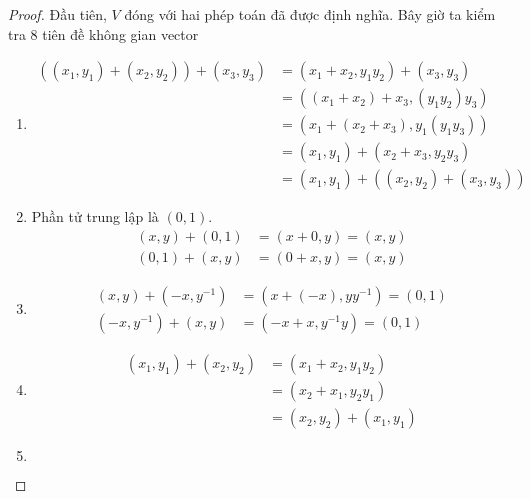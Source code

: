\begin{proof}
    Đầu tiên, $V$ đóng với hai phép toán đã được định nghĩa. Bây giờ ta kiểm tra 8 tiên đề không gian vector
    \begin{enumerate}[label = (V\arabic*)]
        \item
              \begin{align*}
                  ((x_{1}, y_{1}) + (x_{2}, y_{2})) + (x_{3}, y_{3}) & = (x_{1} + x_{2}, y_{1}y_{2}) + (x_{3}, y_{3})       \\
                                                                     & = ((x_{1} + x_{2}) + x_{3}, (y_{1}y_{2})y_{3})       \\
                                                                     & = (x_{1} + (x_{2} + x_{3}), y_{1}(y_{1}y_{3}))       \\
                                                                     & = (x_{1}, y_{1}) + (x_{2} + x_{3}, y_{2}y_{3})       \\
                                                                     & = (x_{1}, y_{1}) + ((x_{2}, y_{2}) + (x_{3}, y_{3}))
              \end{align*}
        \item Phần tử trung lập là $(0, 1)$.
              \begin{align*}
                  (x, y) + (0, 1) & = (x + 0, y) = (x, y) \\
                  (0, 1) + (x, y) & = (0 + x, y) = (x, y)
              \end{align*}
        \item
              \begin{align*}
                  (x, y) + (-x, y^{-1}) & = (x + (-x), yy^{-1}) = (0, 1) \\
                  (-x, y^{-1}) + (x, y) & = (-x + x, y^{-1}y) = (0, 1)
              \end{align*}
        \item
              \begin{align*}
                  (x_{1}, y_{1}) + (x_{2}, y_{2}) & = (x_{1} + x_{2}, y_{1}y_{2})     \\
                                                  & = (x_{2} + x_{1}, y_{2}y_{1})     \\
                                                  & = (x_{2}, y_{2}) + (x_{1}, y_{1})
              \end{align*}
        \item
              \begin{align*}

\end{align*}
\end{enumerate}
\end{proof}
